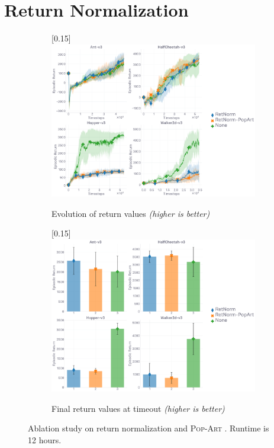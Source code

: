 \section{Return Normalization}
\label{ablationretnorm}

\begin{figure}[H]
  \center
  \begin{subfigure}[t]{0.49\textwidth}
    \center\scalebox{0.15}[0.15]{\includegraphics{Plots/fig20_retnorm_ablation_4envs/plots_eval_env_ret_plot.pdf}}
    \caption{Evolution of return values \textit{(higher is better)}}
  \end{subfigure}
  \begin{subfigure}[t]{0.49\textwidth}
    \center\scalebox{0.15}[0.15]{\includegraphics{Plots/fig20_retnorm_ablation_4envs/plots_eval_env_ret_barplot.pdf}}
    \caption{Final return values at timeout \textit{(higher is better)}}
  \end{subfigure}
  \caption{
  Ablation study on return normalization and \textsc{Pop-Art} \cite{Van_Hasselt2016-bh}.
  Runtime is 12 hours.}
\end{figure}

